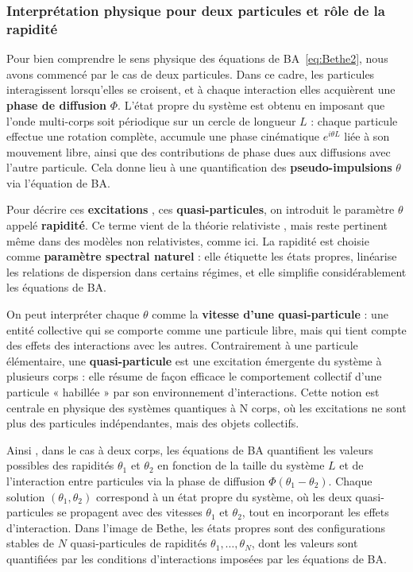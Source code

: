 \subsubsection{Interprétation physique pour deux particules et rôle de la rapidité}

Pour bien comprendre le sens physique des équations de \gls{BA}~\eqref{eq:Bethe2}, nous avons commencé par le cas de deux particules. Dans ce cadre, les particules interagissent lorsqu'elles se croisent, et à chaque interaction elles acquièrent une {\bf phase de diffusion} $\Phi$. L’état propre du système est obtenu en imposant que l’onde multi-corps soit périodique sur un cercle de longueur $L$ : chaque particule effectue une rotation complète, accumule une phase cinématique $e^{i\theta L}$ liée à son mouvement libre, ainsi que des contributions de phase dues aux diffusions avec l’autre particule. Cela donne lieu à une quantification des {\bf pseudo-impulsions} $\theta$ via l’équation de \gls{BA}.

\medskip

Pour décrire ces {\bf excitations} , ces {\bf quasi-particules}, on introduit le paramètre $\theta$ appelé {\bf rapidité}. Ce terme vient de la théorie relativiste \cite{ZAMOLODCHIKOV1979253,Babelon2003}, mais reste pertinent même dans des modèles non relativistes, comme ici. La rapidité est choisie comme {\bf paramètre spectral naturel} : elle étiquette les états propres, linéarise les relations de dispersion dans certains régimes, et elle simplifie considérablement les équations de \gls{BA}.

\medskip

On peut interpréter chaque $\theta$ comme la {\bf vitesse d’une quasi-particule} : une entité collective qui se comporte comme une particule libre, mais qui tient compte des effets des interactions avec les autres. Contrairement à une particule élémentaire, une {\bf quasi-particule} est une excitation émergente du système à plusieurs corps : elle résume de façon efficace le comportement collectif d’une particule « habillée » par son environnement d’interactions. Cette notion est centrale en physique des systèmes quantiques à N corps, où les excitations ne sont plus des particules indépendantes, mais des objets collectifs.

\medskip

Ainsi , dans le cas à deux corps, les équations de \gls{BA} quantifient les valeurs possibles des rapidités $\theta_1$ et $\theta_2$ en fonction de la taille du système $L$ et de l’interaction entre particules via la phase de diffusion $\Phi(\theta_1 - \theta_2)$. Chaque solution $(\theta_1, \theta_2)$ correspond à un état propre du système, où les deux quasi-particules se propagent avec des vitesses $\theta_1$ et $\theta_2$, tout en incorporant les effets d’interaction.
Dans l’image de Bethe, les états propres sont des configurations stables de $N$ quasi-particules de rapidités $\theta_1,\dots,\theta_N$, dont les valeurs sont quantifiées par les conditions d’interactions imposées par les équations de \gls{BA}.



